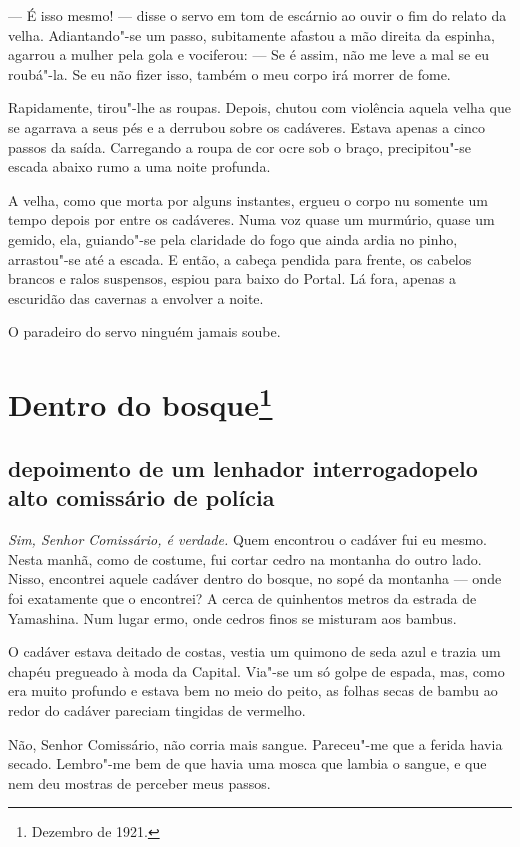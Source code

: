 --- É isso mesmo! --- disse o servo em tom de escárnio ao ouvir o fim do
relato da velha. Adiantando"-se um passo, subitamente afastou a mão
direita da espinha, agarrou a mulher pela gola e vociferou: --- Se é
assim, não me leve a mal se eu roubá"-la. Se eu não fizer isso, também o
meu corpo irá morrer de fome.

Rapidamente, tirou"-lhe as roupas. Depois, chutou com violência aquela
velha que se agarrava a seus pés e a derrubou sobre os cadáveres.
Estava apenas a cinco passos da saída. Carregando a roupa de cor ocre
sob o braço, precipitou"-se escada abaixo rumo a uma noite profunda.

A velha, como que morta por alguns instantes, ergueu o corpo nu somente
um tempo depois por entre os cadáveres. Numa voz quase um murmúrio,
quase um gemido, ela, guiando"-se pela claridade do fogo que ainda ardia
no pinho, arrastou"-se até a escada. E então, a cabeça pendida para
frente, os cabelos brancos e ralos suspensos, espiou para baixo do
Portal. Lá fora, apenas a escuridão das cavernas a envolver a noite.

O paradeiro do servo ninguém jamais soube.

\chapter{Dentro do bosque\footnote{Dezembro de 1921.}}

\section*{depoimento de um lenhador interrogado\break pelo alto comissário de polícia}

\textit{Sim, Senhor Comissário, é verdade.} Quem encontrou o cadáver fui eu mesmo. Nesta manhã, como de costume, fui
cortar cedro na montanha do outro lado. Nisso, encontrei aquele cadáver
dentro do bosque, no sopé da montanha --- onde foi exatamente que o
encontrei? A cerca de quinhentos metros da estrada de Yamashina. Num
lugar ermo, onde cedros finos se misturam aos bambus.

O cadáver estava deitado de costas, vestia um quimono de seda azul e
trazia um chapéu pregueado à moda da Capital. Via"-se um só golpe de
espada, mas, como era muito profundo e estava bem no meio do peito, as
folhas secas de bambu ao redor do cadáver pareciam tingidas de
vermelho.

 Não, Senhor Comissário, não corria mais sangue. Pareceu"-me que a ferida
havia secado. Lembro"-me bem de que havia uma mosca que lambia o sangue,
e que nem deu mostras de perceber meus passos.


